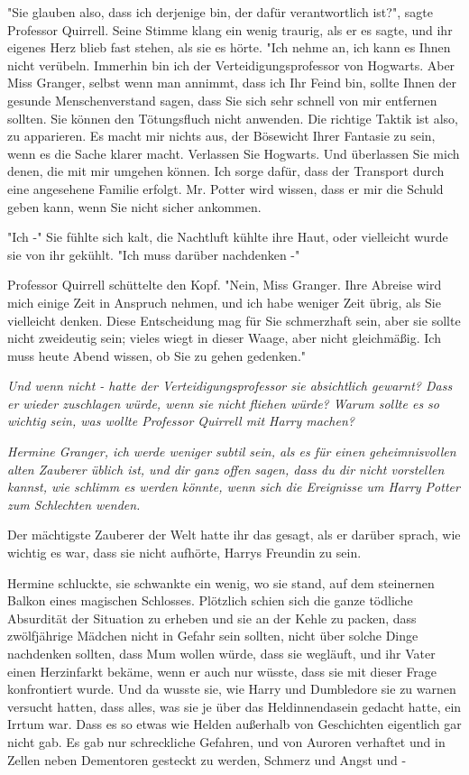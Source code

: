 {"Sie glauben also, dass ich derjenige bin, der dafür verantwortlich ist?", sagte Professor Quirrell. Seine Stimme klang ein wenig traurig, als er es sagte, und ihr eigenes Herz blieb fast stehen, als sie es hörte. "Ich nehme an, ich kann es Ihnen nicht verübeln. Immerhin bin ich der Verteidigungsprofessor von Hogwarts. Aber Miss Granger, selbst wenn man annimmt, dass ich Ihr Feind bin, sollte Ihnen der gesunde Menschenverstand sagen, dass Sie sich sehr schnell von mir entfernen sollten. Sie können den Tötungsfluch nicht anwenden. Die richtige Taktik ist also, zu apparieren. Es macht mir nichts aus, der Bösewicht Ihrer Fantasie zu sein, wenn es die Sache klarer macht. Verlassen Sie Hogwarts. Und überlassen Sie mich denen, die mit mir umgehen können. Ich sorge dafür, dass der Transport durch eine angesehene Familie erfolgt. Mr. Potter wird wissen, dass er mir die Schuld geben kann, wenn Sie nicht sicher ankommen.

"Ich -" Sie fühlte sich kalt, die Nachtluft kühlte ihre Haut, oder vielleicht wurde sie von ihr gekühlt. "Ich muss darüber nachdenken -"

Professor Quirrell schüttelte den Kopf. "Nein, Miss Granger. Ihre Abreise wird mich einige Zeit in Anspruch nehmen, und ich habe weniger Zeit übrig, als Sie vielleicht denken. Diese Entscheidung mag für Sie schmerzhaft sein, aber sie sollte nicht zweideutig sein; vieles wiegt in dieser Waage, aber nicht gleichmäßig. Ich muss heute Abend wissen, ob Sie zu gehen gedenken."

\emph{Und wenn nicht - hatte der Verteidigungsprofessor sie absichtlich gewarnt? Dass er wieder zuschlagen würde, wenn sie nicht fliehen würde? Warum sollte es so wichtig sein, was wollte Professor Quirrell mit Harry machen?}

\emph{Hermine Granger, ich werde weniger subtil sein, als es für einen geheimnisvollen alten Zauberer üblich ist, und dir ganz offen sagen, dass du dir nicht vorstellen kannst, wie schlimm es werden könnte, wenn sich die Ereignisse um Harry Potter zum Schlechten wenden.}

Der mächtigste Zauberer der Welt hatte ihr das gesagt, als er darüber sprach, wie wichtig es war, dass sie nicht aufhörte, Harrys Freundin zu sein.

Hermine schluckte, sie schwankte ein wenig, wo sie stand, auf dem steinernen Balkon eines magischen Schlosses. Plötzlich schien sich die ganze tödliche Absurdität der Situation zu erheben und sie an der Kehle zu packen, dass zwölfjährige Mädchen nicht in Gefahr sein sollten, nicht über solche Dinge nachdenken sollten, dass Mum wollen würde, dass sie wegläuft, und ihr Vater einen Herzinfarkt bekäme, wenn er auch nur wüsste, dass sie mit dieser Frage konfrontiert wurde. Und da wusste sie, wie Harry und Dumbledore sie zu warnen versucht hatten, dass alles, was sie je über das Heldinnendasein gedacht hatte, ein Irrtum war. Dass es so etwas wie Helden außerhalb von Geschichten eigentlich gar nicht gab. Es gab nur schreckliche Gefahren, und von Auroren verhaftet und in Zellen neben Dementoren gesteckt zu werden, Schmerz und Angst und -

}

